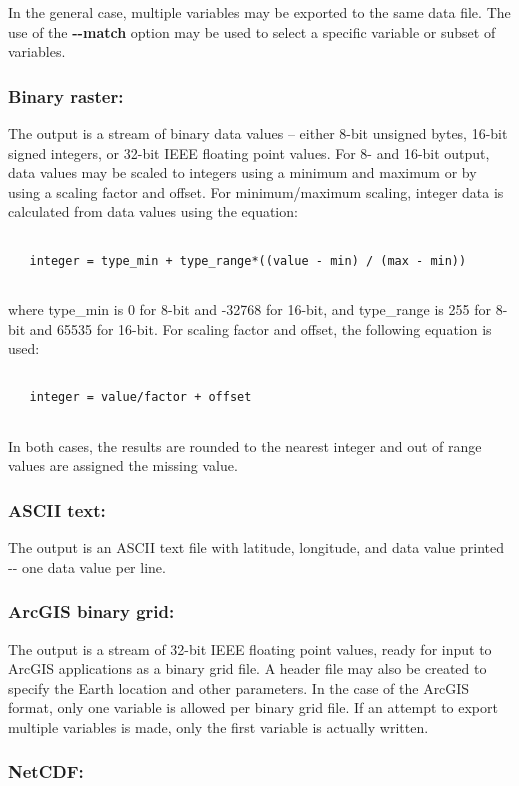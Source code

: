   In the general case, multiple variables may be exported to the same data file. The use of the \textbf{-{-}match}
 option may be used to select a specific variable or subset of variables.
\subsubsection*{Binary raster:}


  The output is a stream of binary data values -- either 8-bit unsigned bytes, 16-bit signed integers, or 32-bit IEEE floating point values. For 8- and 16-bit output, data values may be scaled to integers using a minimum and maximum or by using a scaling factor and offset. For minimum/maximum scaling, integer data is calculated from data values using the equation: \begin{verbatim}

   integer = type_min + type_range*((value - min) / (max - min))
 
\end{verbatim}
 where type\_min is 0 for 8-bit and -32768 for 16-bit, and type\_range is 255 for 8-bit and 65535 for 16-bit. For scaling factor and offset, the following equation is used: \begin{verbatim}

   integer = value/factor + offset
 
\end{verbatim}
 In both cases, the results are rounded to the nearest integer and out of range values are assigned the missing value.
\subsubsection*{ASCII text:}


 The output is an ASCII text file with latitude, longitude, and data value printed -{-} one data value per line.
\subsubsection*{ArcGIS binary grid:}


 The output is a stream of 32-bit IEEE floating point values, ready for input to ArcGIS applications as a binary grid file. A header file may also be created to specify the Earth location and other parameters. In the case of the ArcGIS format, only one variable is allowed per binary grid file. If an attempt to export multiple variables is made, only the first variable is actually written.
\subsubsection*{NetCDF:}


